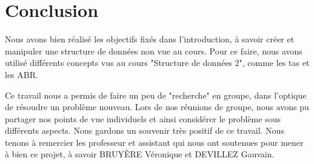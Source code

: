\documentclass[10pt,a4paper]{article}
\begin{document}
\section{Conclusion}
Nous avons bien réalisé les objectifs fixés dans l'introduction, à savoir créer et manipuler une structure de données non vue au cours. Pour ce faire, nous avons utilisé différents concepts vus au cours "Structure de données 2", comme les tas et les ABR.

Ce travail nous a permis de faire un peu de "recherche" en groupe, dans l'optique de résoudre un problème nouveau. Lors de nos réunions de groupe, nous avons pu partager nos points de vue individuels et ainsi considérer le problème sous différents aspects. Nous gardons un souvenir très positif de ce travail. Nous tenons à remercier les professeur et assistant qui nous ont soutenues pour mener à bien ce projet, à savoir BRUYÈRE Véronique et DEVILLEZ Gauvain.
\end{document}
